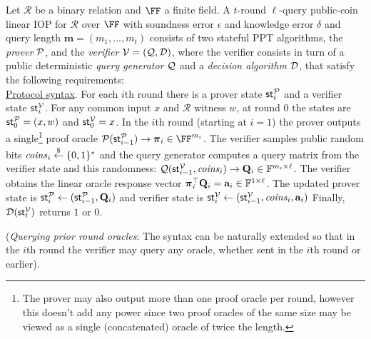 \begin{definition} 
\label{def:linearIOP}
Let $\mathcal{R}$ be a binary relation and $\FF$ a finite field. A $t$-round $\ell$-query public-coin linear IOP for $\mathcal{R}$ over $\FF$ with soundness error $\epsilon$ and knowledge error $\delta$ and query length $\mathbf{m} = (m_1,...,m_t)$ consists of two stateful PPT algorithms, the \emph{prover} $\mathcal{P}$, and the
\emph{verifier} $\mathcal{V} = (\mathcal{Q}, \mathcal{D})$, where the verifier consists in turn of a public deterministic \emph{query generator} $\mathcal{Q}$ and a
\emph{decision algorithm} $\mathcal{D}$, that satisfy the following requirements:\\
 
\noindent \underline{Protocol syntax}. 
For each $i$th round there is a prover state $\textsf{st}^\mathcal{P}_i$ and a verifier state $\textsf{st}^\mathcal{V}_i$. For any common input $x$ and $\mathcal{R}$ witness $w$, at round 0 the states are $\textsf{st}^\mathcal{P}_0 = (x, w)$ and $\textsf{st}^\mathcal{V}_0 = x$. 
In the $i$th round (starting at $i = 1$) the prover outputs a single\footnote{The prover may also output more than one proof oracle per round, however this doesn't add any power since two proof oracles of the same size may be viewed as a single (concatenated) oracle of twice the length.} proof oracle $\prover(\textsf{st}^\prover_{i-1}) \rightarrow \proofO_i \in \FF^{m_i}$. The verifier samples public random bits $\mathit{coins}_i \overset{\$}{\gets} \{0,1\}^*$ and the query generator computes a query matrix from the verifier state and this randomness: $\mathcal{Q}(\textsf{st}^\mathcal{V}_{i-1}, \mathit{coins}_i) \rightarrow \mathbf{Q}_i \in \mathbb{F}^{m_i \times \ell}$. The verifier obtains the linear oracle response vector $\boldsymbol{\pi}_i^\top \mathbf{Q}_i = \mathbf{a}_i \in \mathbb{F}^{1 \times \ell}$. The updated prover state is $\textsf{st}^\mathcal{P}_i \leftarrow (\textsf{st}^\mathcal{P}_{i-1}, \mathbf{Q}_i)$
and verifier state is $\textsf{st}^\mathcal{V}_i \leftarrow (\textsf{st}^\mathcal{V}_{i-1}, \mathit{coins}_i, \mathbf{a}_i)$
Finally, $\mathcal{D}(\textsf{st}^\mathcal{V}_t)$ returns $1$ or $0$. 

(\emph{Querying prior round oracles}: The syntax can be naturally extended so that in the $i$th round the verifier may query any oracle, whether sent in the $i$th round or earlier). \\ 



\end{definition}
